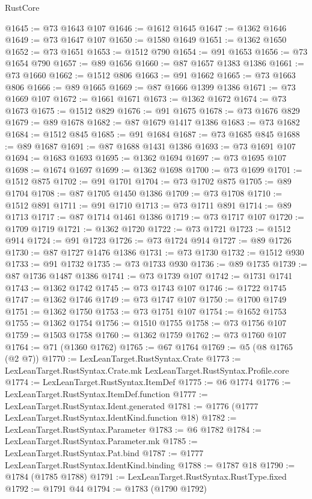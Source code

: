 \begin{lexlean}{RustCore}
\begin{coremodule}
@1645 := @73 @1643 @107
@1646 := @1612 @1645
@1647 := @1362 @1646
@1649 := @73 @1647 @107
@1650 := @1580 @1649
@1651 := @1362 @1650
@1652 := @73 @1651
@1653 := @1512 @790
@1654 := @91 @1653
@1656 := @73 @1654 @790
@1657 := @89 @1656
@1660 := @87 @1657 @1383 @1386
@1661 := @73 @1660
@1662 := @1512 @806
@1663 := @91 @1662
@1665 := @73 @1663 @806
@1666 := @89 @1665
@1669 := @87 @1666 @1399 @1386
@1671 := @73 @1669 @107
@1672 := @1661 @1671
@1673 := @1362 @1672
@1674 := @73 @1673
@1675 := @1512 @829
@1676 := @91 @1675
@1678 := @73 @1676 @829
@1679 := @89 @1678
@1682 := @87 @1679 @1417 @1386
@1683 := @73 @1682
@1684 := @1512 @845
@1685 := @91 @1684
@1687 := @73 @1685 @845
@1688 := @89 @1687
@1691 := @87 @1688 @1431 @1386
@1693 := @73 @1691 @107
@1694 := @1683 @1693
@1695 := @1362 @1694
@1697 := @73 @1695 @107
@1698 := @1674 @1697
@1699 := @1362 @1698
@1700 := @73 @1699
@1701 := @1512 @875
@1702 := @91 @1701
@1704 := @73 @1702 @875
@1705 := @89 @1704
@1708 := @87 @1705 @1450 @1386
@1709 := @73 @1708
@1710 := @1512 @891
@1711 := @91 @1710
@1713 := @73 @1711 @891
@1714 := @89 @1713
@1717 := @87 @1714 @1461 @1386
@1719 := @73 @1717 @107
@1720 := @1709 @1719
@1721 := @1362 @1720
@1722 := @73 @1721
@1723 := @1512 @914
@1724 := @91 @1723
@1726 := @73 @1724 @914
@1727 := @89 @1726
@1730 := @87 @1727 @1476 @1386
@1731 := @73 @1730
@1732 := @1512 @930
@1733 := @91 @1732
@1735 := @73 @1733 @930
@1736 := @89 @1735
@1739 := @87 @1736 @1487 @1386
@1741 := @73 @1739 @107
@1742 := @1731 @1741
@1743 := @1362 @1742
@1745 := @73 @1743 @107
@1746 := @1722 @1745
@1747 := @1362 @1746
@1749 := @73 @1747 @107
@1750 := @1700 @1749
@1751 := @1362 @1750
@1753 := @73 @1751 @107
@1754 := @1652 @1753
@1755 := @1362 @1754
@1756 := @1510 @1755
@1758 := @73 @1756 @107
@1759 := @1503 @1758
@1760 := @1362 @1759
@1762 := @73 @1760 @107
@1764 := @71 (@1360 @1762)
@1765 := @67 @1764
@1769 := @5 (@8 @1765 (@2 @7))
@1770 := LexLeanTarget.RustSyntax.Crate
@1773 := LexLeanTarget.RustSyntax.Crate.mk LexLeanTarget.RustSyntax.Profile.core
@1774 := LexLeanTarget.RustSyntax.ItemDef
@1775 := @6 @1774
@1776 := LexLeanTarget.RustSyntax.ItemDef.function
@1777 := LexLeanTarget.RustSyntax.Ident.generated
@1781 := @1776 (@1777 LexLeanTarget.RustSyntax.IdentKind.function @18)
@1782 := LexLeanTarget.RustSyntax.Parameter
@1783 := @6 @1782
@1784 := LexLeanTarget.RustSyntax.Parameter.mk
@1785 := LexLeanTarget.RustSyntax.Pat.bind
@1787 := @1777 LexLeanTarget.RustSyntax.IdentKind.binding
@1788 := @1787 @18
@1790 := @1784 (@1785 @1788)
@1791 := LexLeanTarget.RustSyntax.RustType.fixed
@1792 := @1791 @44
@1794 := @1783 (@1790 @1792)

\end{coremodule}
\end{lexlean}
